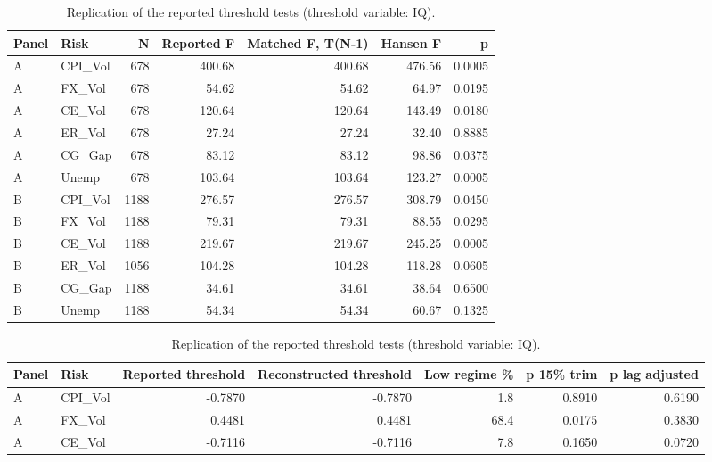 \documentclass[preprint,12pt,authoryear]{elsarticle}
\begin{document}
\begin{table}[!htbp]
\centering
\scriptsize
\setlength{\tabcolsep}{3pt}
\caption{Replication of the reported threshold tests (threshold variable: IQ).}
\label{tab:thresh}
\par{}\par\smallskip
\begin{adjustbox}{max width=\textwidth}
\begin{tabular}{llrrrrr}
\toprule
Panel & Risk & N & Reported F & Matched F, T(N-1) & Hansen F & p \\
\midrule
A & CPI\_Vol & 678 & 400.68 & 400.68 & 476.56 & 0.0005 \\
A & FX\_Vol & 678 & 54.62 & 54.62 & 64.97 & 0.0195 \\
A & CE\_Vol & 678 & 120.64 & 120.64 & 143.49 & 0.0180 \\
A & ER\_Vol & 678 & 27.24 & 27.24 & 32.40 & 0.8885 \\
A & CG\_Gap & 678 & 83.12 & 83.12 & 98.86 & 0.0375 \\
A & Unemp & 678 & 103.64 & 103.64 & 123.27 & 0.0005 \\
B & CPI\_Vol & 1188 & 276.57 & 276.57 & 308.79 & 0.0450 \\
B & FX\_Vol & 1188 & 79.31 & 79.31 & 88.55 & 0.0295 \\
B & CE\_Vol & 1188 & 219.67 & 219.67 & 245.25 & 0.0005 \\
B & ER\_Vol & 1056 & 104.28 & 104.28 & 118.28 & 0.0605 \\
B & CG\_Gap & 1188 & 34.61 & 34.61 & 38.64 & 0.6500 \\
B & Unemp & 1188 & 54.34 & 54.34 & 60.67 & 0.1325 \\
\bottomrule
\end{tabular}
\end{adjustbox}
\par{}\par\smallskip
\begin{adjustbox}{max width=\textwidth}
\begin{tabular}{llrrrrr}
\toprule
Panel & Risk & Reported threshold & Reconstructed threshold & Low regime \% & p 15\% trim & p lag adjusted \\
\midrule
A & CPI\_Vol & -0.7870 & -0.7870 & 1.8 & 0.8910 & 0.6190 \\
A & FX\_Vol & 0.4481 & 0.4481 & 68.4 & 0.0175 & 0.3830 \\
A & CE\_Vol & -0.7116 & -0.7116 & 7.8 & 0.1650 & 0.0720 \\

\end{tabular}
\end{adjustbox}
\end{table}
\end{document}
